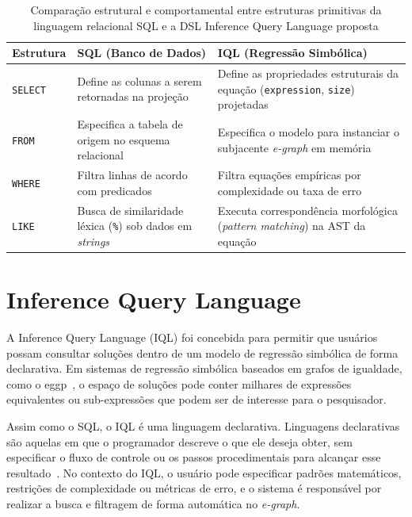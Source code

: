 \begin{table}[htbp]
    \centering
    \caption{Comparação estrutural e comportamental entre estruturas primitivas da linguagem relacional SQL e a DSL Inference Query Language proposta}
    \label{tab:iql_sql_comparison}
    \begin{tabular}{p{2.5cm} p{6cm} p{6cm}}
        \toprule
        \textbf{Estrutura} & \textbf{SQL (Banco de Dados)} & \textbf{IQL (Regressão Simbólica)} \\
        \midrule
        \texttt{SELECT} & Define as colunas a serem retornadas na projeção & Define as propriedades estruturais da equação (\texttt{expression}, \texttt{size}) projetadas \\
        \texttt{FROM} & Especifica a tabela de origem no esquema relacional & Especifica o modelo para instanciar o subjacente \textit{e-graph} em memória \\
        \texttt{WHERE} & Filtra linhas de acordo com predicados & Filtra equações empíricas por complexidade ou taxa de erro \\
        \texttt{LIKE} & Busca de similaridade léxica (\texttt{\%}) sob dados em \textit{strings} & Executa correspondência morfológica (\textit{pattern matching}) na AST da equação \\
        \bottomrule
    \end{tabular}
\end{table}

\section{Inference Query Language}
A Inference Query Language (IQL) foi concebida para permitir que usuários possam consultar soluções dentro de um modelo de regressão simbólica de forma declarativa. Em sistemas de regressão simbólica baseados em grafos de igualdade, como o eggp~\cite{eggp}, o espaço de soluções pode conter milhares de expressões equivalentes ou sub-expressões que podem ser de interesse para o pesquisador.

Assim como o SQL, o IQL é uma linguagem declarativa. Linguagens declarativas são aquelas em que o programador descreve o que ele deseja obter, sem especificar o fluxo de controle ou os passos procedimentais para alcançar esse resultado~\cite{sommerville2011software}. No contexto do IQL, o usuário pode especificar padrões matemáticos, restrições de complexidade ou métricas de erro, e o sistema é responsável por realizar a busca e filtragem de forma automática no \textit{e-graph}.

